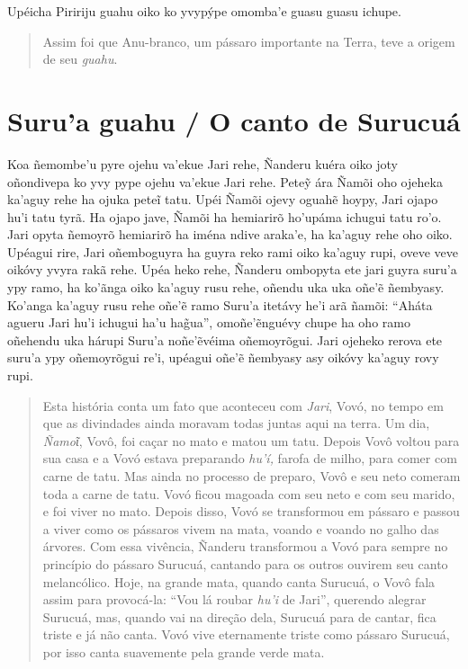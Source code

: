 \begin{itemize}




Upéicha Piririju guahu oiko ko yvypýpe omomba'e guasu guasu ichupe.

\begin{quote}
Assim foi que Anu-branco, um pássaro importante na Terra, teve a origem
de seu \emph{guahu}.
\end{quote}

\chapter{Suru'a guahu / O canto de Surucuá}

Koa ñemombe'u pyre ojehu va'ekue Jari rehe, Ñanderu kuéra oiko joty
oñondivepa ko yvy pype ojehu va'ekue Jari rehe. Peteỹ ára Ñamõi oho
ojeheka ka'aguy rehe ha ojuka peteĩ tatu. Upéi Ñamõi ojevy oguahẽ hoypy,
Jari ojapo hu'i tatu tyrã. Ha ojapo jave, Ñamõi ha hemiarirõ ho'upáma
ichugui tatu ro'o. Jari opyta ñemoyrõ hemiarirõ ha iména ndive araka'e,
ha ka'aguy rehe oho oiko. Upéagui rire, Jari oñemboguyra ha guyra reko
rami oiko ka'aguy rupi, oveve veve oikóvy yvyra rakã rehe. Upéa heko
rehe, Ñanderu ombopyta ete jari guyra suru'a ypy ramo, ha ko'ãnga oiko
ka'aguy rusu rehe, oñendu uka uka oñe'ẽ ñembyasy. Ko'anga ka'aguy rusu
rehe oñe'ẽ ramo Suru'a itetávy he'i arã ñamõi: ``Aháta agueru Jari hu'i
ichugui ha'u hag̃ua'', omoñe'ẽnguévy chupe ha oho ramo oñehendu uka
hárupi Suru'a noñe'ẽvéima oñemoyrõgui. Jari ojeheko rerova ete suru'a
ypy oñemoyrõgui re'i, upéagui oñe'ẽ ñembyasy asy oikóvy ka'aguy rovy
rupi.

\begin{quote}
Esta história conta um fato que aconteceu com \emph{Jari}, Vovó, no
tempo em que as divindades ainda moravam todas juntas aqui na terra. Um
dia, \emph{Ñamoῖ}, Vovô, foi caçar no mato e matou um tatu. Depois Vovô
voltou para sua casa e a Vovó estava preparando \emph{hu'í,} farofa de
milho, para comer com carne de tatu. Mas ainda no processo de preparo,
Vovô e seu neto comeram toda a carne de tatu. Vovó ficou magoada com seu
neto e com seu marido, e foi viver no mato. Depois disso, Vovó se
transformou em pássaro e passou a viver como os pássaros vivem na mata,
voando e voando no galho das árvores. Com essa vivência, Ñanderu
transformou a Vovó para sempre no princípio do pássaro Surucuá, cantando
para os outros ouvirem seu canto melancólico. Hoje, na grande mata,
quando canta Surucuá, o Vovô fala assim para provocá-la: ``Vou lá roubar
\emph{hu'i} de Jari'', querendo alegrar Surucuá, mas, quando vai na
direção dela, Surucuá para de cantar, fica triste e já não canta. Vovó
vive eternamente triste como pássaro Surucuá, por isso canta suavemente
pela grande verde mata.
\end{quote}


\end{itemize}
